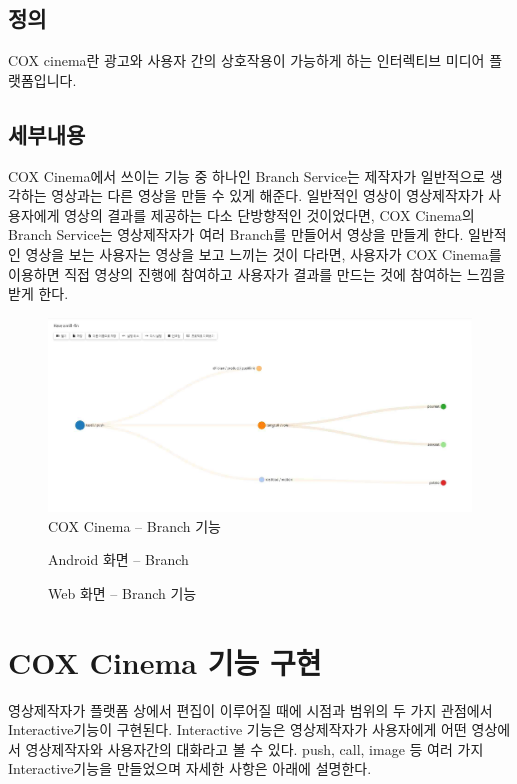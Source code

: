 \documentclass{oblivoir}
\begin{document}
\subsection{정의}

COX cinema란 광고와 사용자 간의 상호작용이 가능하게 하는 인터렉티브 미디어 플랫폼입니다. 	


\subsection{ 세부내용}

COX Cinema에서 쓰이는 기능 중 하나인 Branch Service는 제작자가 일반적으로 생각하는 영상과는 다른 영상을 만들 수 있게 해준다. 일반적인 영상이 영상제작자가 사용자에게 영상의 결과를 제공하는 다소 단방향적인 것이었다면, COX Cinema의 Branch Service는 영상제작자가 여러 Branch를 만들어서 영상을 만들게 한다. 일반적인 영상을 보는 사용자는 영상을 보고 느끼는 것이 다라면, 사용자가 COX Cinema를 이용하면 직접 영상의 진행에 참여하고 사용자가 결과를 만드는 것에 참여하는 느낌을 받게 한다.     

\begin{figure}[h!]
    \centering
        \includegraphics{pic/chp7/img994}
    \caption{COX Cinema – Branch 기능}
\end{figure}

\begin{figure}[h!]
\centering
\caption{Android 화면 – Branch }
\end{figure}

\begin{figure}[h!]
\centering
\caption{Web 화면 – Branch 기능}
\end{figure}


\section{ COX Cinema 기능 구현}
영상제작자가 플랫폼 상에서 편집이 이루어질 때에 시점과 범위의 두 가지 관점에서 Interactive기능이 구현된다. Interactive 기능은 영상제작자가 사용자에게 어떤 영상에서 영상제작자와 사용자간의 대화라고 볼 수 있다. push, call, image 등 여러 가지 Interactive기능을 만들었으며 자세한 사항은 아래에 설명한다.  
\end{document}
